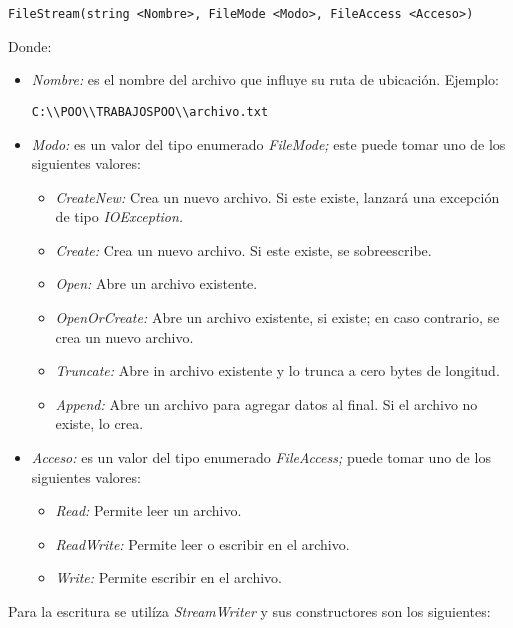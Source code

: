 \documentclass[letterpaper, 12pt]{article}
\begin{document}
\begin{justify}
\begin{verbatim}
FileStream(string <Nombre>, FileMode <Modo>, FileAccess <Acceso>) \end{verbatim}
        Donde:
        \begin{itemize}
        \item \emph{Nombre: }es el nombre del archivo que influye su ruta de ubicación. Ejemplo:
            \begin{verbatim}
C:\\POO\\TRABAJOSPOO\\archivo.txt \end{verbatim}
        \item \emph{Modo: }es un valor del tipo enumerado \emph{FileMode;} este puede tomar uno de los siguientes valores:
                \begin{itemize}
                    \item \emph{CreateNew:} Crea un nuevo archivo. Si este existe, lanzará una excepción de tipo \emph{IOException.}
                    \item \emph{Create:} Crea un nuevo archivo. Si este existe, se sobreescribe.
                    \item \emph{Open:} Abre un archivo existente.
                    \item \emph{OpenOrCreate:} Abre un archivo existente, si existe; en caso contrario, se crea un nuevo archivo.
                    \item \emph{Truncate: }Abre in archivo existente y lo trunca a cero bytes de longitud.
                    \item \emph{Append: }Abre un archivo para agregar datos al final. Si el archivo no existe, lo crea.
                \end{itemize}
        \item \emph{Acceso: }es un valor del tipo enumerado \emph{FileAccess;} puede tomar uno de los siguientes valores:
                \begin{itemize}
                    \item \emph{Read: }Permite leer un archivo.
                    \item \emph{ReadWrite: }Permite leer o escribir en el archivo.
                    \item \emph{Write: }Permite escribir en el archivo.
                \end{itemize}
        \end{itemize}
        Para la escritura se utilíza \emph{StreamWriter} y sus constructores son los siguientes:

\end{justify}
\end{document}
